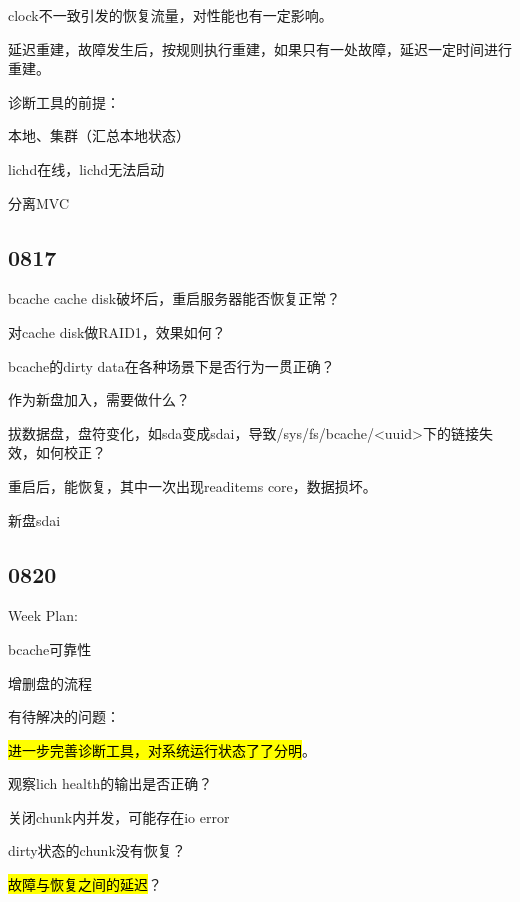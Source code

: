 clock不一致引发的恢复流量，对性能也有一定影响。

延迟重建，故障发生后，按规则执行重建，如果只有一处故障，延迟一定时间进行重建。

诊断工具的前提：
\begin{enumbox}
\item 本地、集群（汇总本地状态）
\item lichd在线，lichd无法启动
\item 分离MVC
\end{enumbox}

\subsection{0817}

\begin{enumbox}
\item bcache cache disk破坏后，重启服务器能否恢复正常？
\item 对cache disk做RAID1，效果如何？
\item bcache的dirty data在各种场景下是否行为一贯正确？
\item 作为新盘加入，需要做什么？
\end{enumbox}

拔数据盘，盘符变化，如sda变成sdai，导致/sys/fs/bcache/<uuid>下的链接失效，如何校正？

重启后，能恢复，其中一次出现readitems core，数据损坏。

新盘sdai

\subsection{0820}

Week Plan:
\begin{enumbox}
\item bcache可靠性
\item 增删盘的流程
\end{enumbox}

有待解决的问题：
\begin{enumbox}
\item \hl{进一步完善诊断工具，对系统运行状态了了分明}。
\item 观察lich health的输出是否正确？
\item 关闭chunk内并发，可能存在io error
\item dirty状态的chunk没有恢复？
\item \hl{故障与恢复之间的延迟}？
\end{enumbox}

